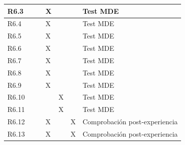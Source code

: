 \begin{longtable}[c]{@{}lllllll@{}}
\multicolumn{1}{|l|}{R6.3} & \multicolumn{1}{l|}{} & \multicolumn{1}{l|}{} & \multicolumn{1}{l|}{X} & \multicolumn{1}{l|}{} & \multicolumn{1}{l|}{} & \multicolumn{1}{l|}{Test MDE} \\* \midrule
\multicolumn{1}{|l|}{R6.4} & \multicolumn{1}{l|}{} & \multicolumn{1}{l|}{} & \multicolumn{1}{l|}{X} & \multicolumn{1}{l|}{} & \multicolumn{1}{l|}{} & \multicolumn{1}{l|}{Test MDE} \\* \midrule
\multicolumn{1}{|l|}{R6.5} & \multicolumn{1}{l|}{} & \multicolumn{1}{l|}{} & \multicolumn{1}{l|}{X} & \multicolumn{1}{l|}{} & \multicolumn{1}{l|}{} & \multicolumn{1}{l|}{Test MDE} \\* \midrule
\multicolumn{1}{|l|}{R6.6} & \multicolumn{1}{l|}{} & \multicolumn{1}{l|}{} & \multicolumn{1}{l|}{X} & \multicolumn{1}{l|}{} & \multicolumn{1}{l|}{} & \multicolumn{1}{l|}{Test MDE} \\* \midrule
\multicolumn{1}{|l|}{R6.7} & \multicolumn{1}{l|}{} & \multicolumn{1}{l|}{} & \multicolumn{1}{l|}{X} & \multicolumn{1}{l|}{} & \multicolumn{1}{l|}{} & \multicolumn{1}{l|}{Test MDE} \\* \midrule
\multicolumn{1}{|l|}{R6.8} & \multicolumn{1}{l|}{} & \multicolumn{1}{l|}{} & \multicolumn{1}{l|}{X} & \multicolumn{1}{l|}{} & \multicolumn{1}{l|}{} & \multicolumn{1}{l|}{Test MDE} \\* \midrule
\multicolumn{1}{|l|}{R6.9} & \multicolumn{1}{l|}{} & \multicolumn{1}{l|}{} & \multicolumn{1}{l|}{X} & \multicolumn{1}{l|}{} & \multicolumn{1}{l|}{} & \multicolumn{1}{l|}{Test MDE} \\* \midrule
\multicolumn{1}{|l|}{R6.10} & \multicolumn{1}{l|}{} & \multicolumn{1}{l|}{} & \multicolumn{1}{l|}{} & \multicolumn{1}{l|}{X} & \multicolumn{1}{l|}{} & \multicolumn{1}{l|}{Test MDE} \\* \midrule
\multicolumn{1}{|l|}{R6.11} & \multicolumn{1}{l|}{} & \multicolumn{1}{l|}{} & \multicolumn{1}{l|}{} & \multicolumn{1}{l|}{X} & \multicolumn{1}{l|}{} & \multicolumn{1}{l|}{Test MDE} \\* \midrule
\multicolumn{1}{|l|}{R6.12} & \multicolumn{1}{l|}{} & \multicolumn{1}{l|}{} & \multicolumn{1}{l|}{X} & \multicolumn{1}{l|}{} & \multicolumn{1}{l|}{X} & \multicolumn{1}{l|}{Comprobación post-experiencia} \\* \midrule
\multicolumn{1}{|l|}{R6.13} & \multicolumn{1}{l|}{} & \multicolumn{1}{l|}{} & \multicolumn{1}{l|}{X} & \multicolumn{1}{l|}{} & \multicolumn{1}{l|}{X} & \multicolumn{1}{l|}{Comprobación post-experiencia} \\* \midrule

\end{longtable}
